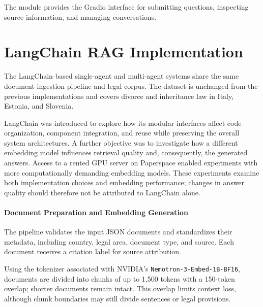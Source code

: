 \documentclass[a4paper,12pt]{report}
\begin{document}
The  module provides the Gradio interface for submitting
questions, inspecting source information, and managing conversations.

























\chapter{LangChain RAG Implementation}

The LangChain-based single-agent and multi-agent systems share the
same document ingestion pipeline and legal corpus. The dataset is
unchanged from the previous implementations and covers divorce and
inheritance law in Italy, Estonia, and Slovenia.

LangChain was introduced to explore how its modular interfaces
affect code organization, component integration, and reuse while
preserving the overall system architectures. A further objective
was to investigate how a different embedding model influences
retrieval quality and, consequently, the generated answers.
Access to a rented GPU server on Paperspace enabled experiments
with more computationally demanding embedding models. These
experiments examine both implementation choices and embedding
performance; changes in answer quality should therefore not be
attributed to LangChain alone.

\subsubsection{Document Preparation and Embedding Generation}

The pipeline validates the input JSON documents and standardizes
their metadata, including country, legal area, document type, and
source. Each document receives a citation label for source
attribution.

Using the tokenizer associated with NVIDIA's
\texttt{Nemotron-3-Embed-1B-BF16}, documents are divided into chunks
of up to 1,500 tokens with a 150-token overlap; shorter documents
remain intact. This overlap limits context loss, although chunk
boundaries may still divide sentences or legal provisions.
\end{document}
